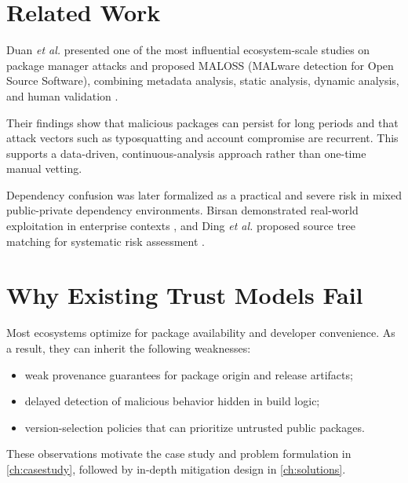 \section{Related Work}

Duan \textit{et al.} presented one of the most influential ecosystem-scale studies on package
manager attacks and proposed MALOSS (MALware detection for Open Source Software), combining
metadata analysis, static analysis, dynamic analysis, and human validation \citep{duan2021ndss}.

Their findings show that malicious packages can persist for long periods and that attack vectors
such as typosquatting and account compromise are recurrent. This supports a data-driven,
continuous-analysis approach rather than one-time manual vetting.

Dependency confusion was later formalized as a practical and severe risk in mixed public-private
dependency environments. Birsan demonstrated real-world exploitation in enterprise contexts
\citep{birsan2021dependencyconfusion}, and Ding \textit{et al.} proposed source tree matching for
systematic risk assessment \citep{ding2024dependency}.

\section{Why Existing Trust Models Fail}

Most ecosystems optimize for package availability and developer convenience.
As a result, they can inherit the following weaknesses:

\begin{itemize}
\item weak provenance guarantees for package origin and release artifacts;
\item delayed detection of malicious behavior hidden in build logic;
\item version-selection policies that can prioritize untrusted public packages.
\end{itemize}

These observations motivate the case study and problem formulation in \cref{ch:casestudy},
followed by in-depth mitigation design in \cref{ch:solutions}.
